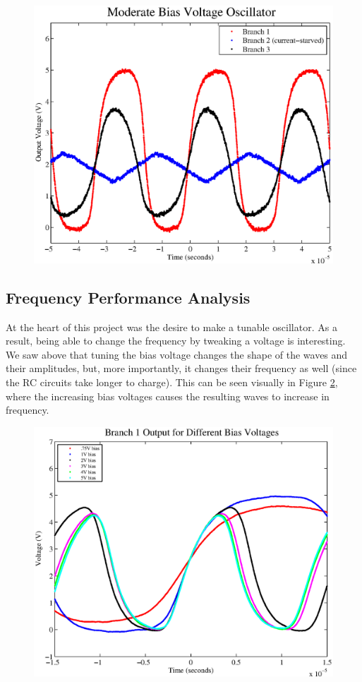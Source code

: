 \documentclass{article}
\begin{document}
\begin{figure}[H]
\centering
\includegraphics[scale=.6]{moderate_bias.eps}
\caption{}
\label{moderateBias}
\end{figure}

\subsection*{Frequency Performance Analysis}

At the heart of this project was the desire to make a tunable oscillator. As a result, being able to change the frequency by tweaking a voltage is interesting.  We saw above that tuning the bias voltage changes the shape of the waves and their amplitudes, but, more importantly, it changes their frequency as well (since the RC circuits take longer to charge).  This can be seen visually in Figure \ref{branch}, where the increasing bias voltages causes the resulting waves to increase in frequency.

\begin{figure}[H]
\centering
\includegraphics[scale=.6]{b1_out.eps}
\caption{}
\label{branch}
\end{figure}
\end{document}
